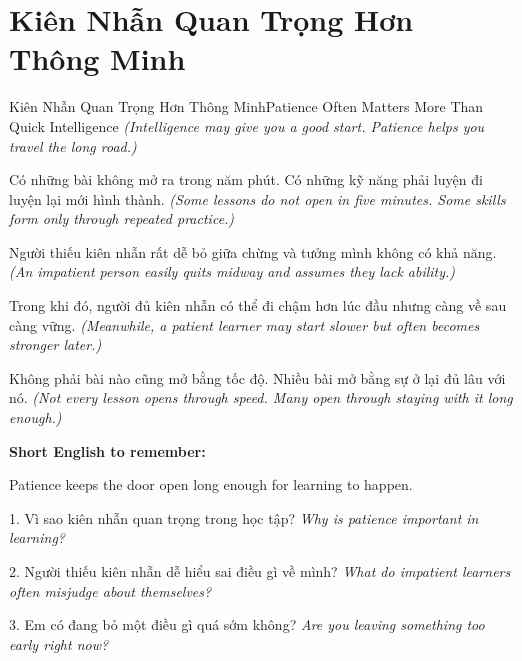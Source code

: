 \section{Kiên Nhẫn Quan Trọng Hơn Thông Minh}
\begin{truyen}{Kiên Nhẫn Quan Trọng Hơn Thông Minh}{Patience Often Matters More Than Quick Intelligence}
\textit{(Intelligence may give you a good start. Patience helps you travel the long road.)}

Có những bài không mở ra trong năm phút. Có những kỹ năng phải luyện đi luyện lại mới hình thành.
\textit{(Some lessons do not open in five minutes. Some skills form only through repeated practice.)}

Người thiếu kiên nhẫn rất dễ bỏ giữa chừng và tưởng mình không có khả năng.
\textit{(An impatient person easily quits midway and assumes they lack ability.)}

Trong khi đó, người đủ kiên nhẫn có thể đi chậm hơn lúc đầu nhưng càng về sau càng vững.
\textit{(Meanwhile, a patient learner may start slower but often becomes stronger later.)}
\end{truyen}

\begin{baihoc}
Không phải bài nào cũng mở bằng tốc độ. Nhiều bài mở bằng sự ở lại đủ lâu với nó.
\textit{(Not every lesson opens through speed. Many open through staying with it long enough.)}
\end{baihoc}

\begin{ghinhoanh}
\textbf{Short English to remember:}

Patience keeps the door open long enough for learning to happen.

\end{ghinhoanh}

\begin{tuhocnhanh}
1. Vì sao kiên nhẫn quan trọng trong học tập? \textit{Why is patience important in learning?}

2. Người thiếu kiên nhẫn dễ hiểu sai điều gì về mình? \textit{What do impatient learners often misjudge about themselves?}

3. Em có đang bỏ một điều gì quá sớm không? \textit{Are you leaving something too early right now?}
\end{tuhocnhanh}
\ngancach

